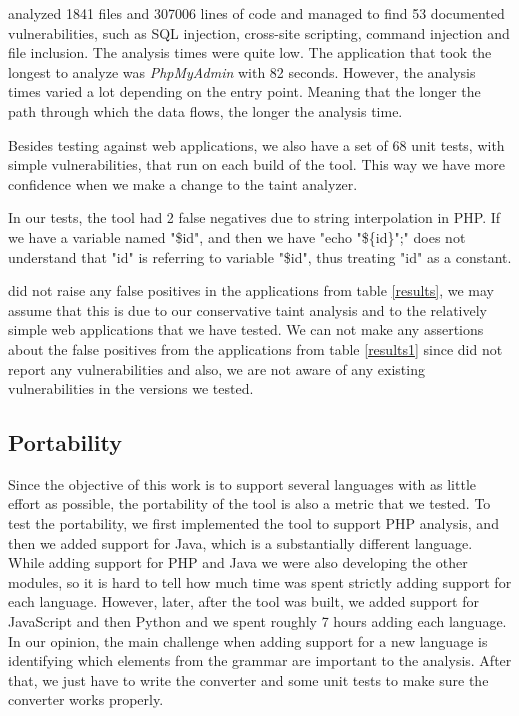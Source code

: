 \toolname{} analyzed 1841 files and 307006 lines of code and managed to find 53 documented vulnerabilities, such as SQL injection, cross-site scripting, command injection and file inclusion. The analysis times were quite low. The application that took the longest to analyze was \textit{PhpMyAdmin} with 82 seconds. However, the analysis times varied a lot depending on the entry point. Meaning that the longer the path through which the data flows, the longer the analysis time.
 
Besides testing \toolname{} against web applications, we also have a set of 68 unit tests, with simple vulnerabilities, that run on each build of the tool. This way we have more confidence when we make a change to the taint analyzer.


In our tests, the tool had 2 false negatives due to string interpolation in PHP. If we have a variable named "\$id", and then we have "echo "\$\{id\}";" \toolname{} does not understand that "id" is referring to variable "\$id", thus treating "id" as a constant.

\toolname{} did not raise any false positives in the applications from table \ref{results}, we may assume that this is due to our conservative taint analysis and to the relatively simple web applications that we have tested. We can not make any assertions about the false positives from the applications from table \ref{results1} since \toolname{} did not report any vulnerabilities and also, we are not aware of any existing vulnerabilities in the versions we tested.





\subsection{Portability}

Since the objective of this work is to support several languages with as little effort as possible, the portability of the tool is also a metric that we tested. To test the portability, we first implemented the tool to support PHP analysis, and then we added support for Java, which is a substantially different language. While adding support for PHP and Java we were also developing the other modules, so it is hard to tell how much time was spent strictly adding support for each language. However, later, after the tool was built, we added support for JavaScript and then Python and we spent roughly 7 hours adding each language. In our opinion, the main challenge when adding support for a new language is identifying which elements from the grammar are important to the analysis. After that, we just have to  write the converter and some unit tests to make sure the converter works properly.

